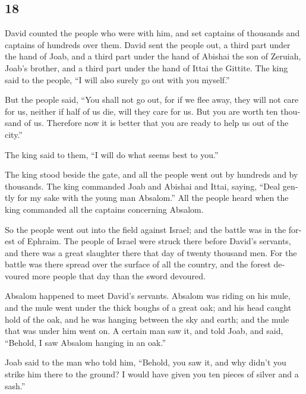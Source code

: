 \begin{paracol}{2}
\switchcolumn
\begin{otherlanguage}{english}

\hypertarget{section-35}{%
\section{18}\label{section-35}}

 David counted the people who were with him, and set
captains of thousands and captains of hundreds over them. 
David sent the people out, a third part under the hand of Joab, and a
third part under the hand of Abishai the son of Zeruiah, Joab's brother,
and a third part under the hand of Ittai the Gittite. The king said to
the people, ``I will also surely go out with you myself.''

 But the people said, ``You shall not go out, for if we
flee away, they will not care for us, neither if half of us die, will
they care for us. But you are worth ten thousand of us. Therefore now it
is better that you are ready to help us out of the city.''

 The king said to them, ``I will do what seems best to
you.''

The king stood beside the gate, and all the people went out by hundreds
and by thousands.  The king commanded Joab and Abishai and
Ittai, saying, ``Deal gently for my sake with the young man Absalom.''
All the people heard when the king commanded all the captains concerning
Absalom.

 So the people went out into the field against Israel; and
the battle was in the forest of Ephraim.  The people of
Israel were struck there before David's servants, and there was a great
slaughter there that day of twenty thousand men.  For the
battle was there spread over the surface of all the country, and the
forest devoured more people that day than the sword devoured.

 Absalom happened to meet David's servants. Absalom was
riding on his mule, and the mule went under the thick boughs of a great
oak; and his head caught hold of the oak, and he was hanging between the
sky and earth; and the mule that was under him went on. 
A certain man saw it, and told Joab, and said, ``Behold, I saw Absalom
hanging in an oak.''

 Joab said to the man who told him, ``Behold, you saw it,
and why didn't you strike him there to the ground? I would have given
you ten pieces of silver and a sash.''


\end{otherlanguage}
\end{paracol}
